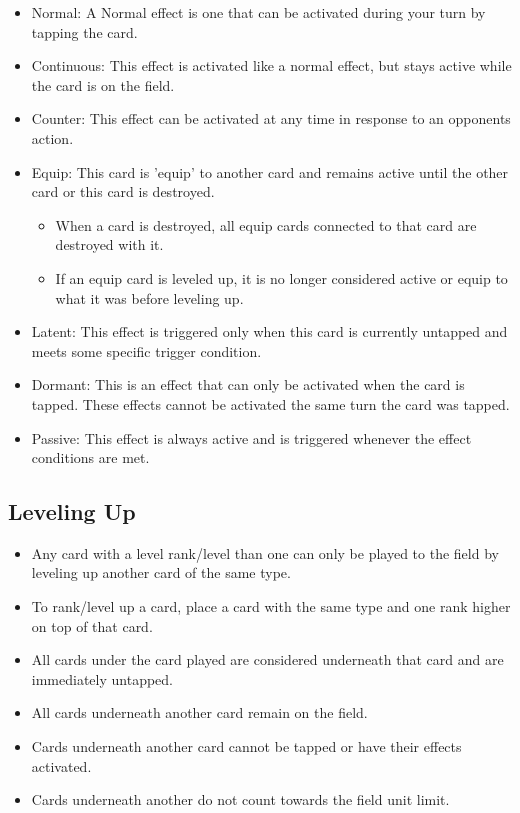 \begin{itemize}
\begin{itemize}
        \item Normal: A Normal effect is one that can be activated during your turn by tapping the card.
        \item Continuous: This effect is activated like a normal effect, but stays active while the card is on the field.
		\item Counter: This effect can be activated at any time in response to an opponents action.
		\item Equip: This card is 'equip' to another card and remains active until the other card or this card is destroyed. 
		\begin{itemize}
			\item When a card is destroyed, all equip cards connected to that card are destroyed with it.
			\item If an equip card is leveled up, it is no longer considered active or equip to what it was before leveling up.
		\end{itemize}
		\item Latent: This effect is triggered only when this card is currently untapped and meets some specific trigger condition. 
		\item Dormant: This is an effect that can only be activated when the card is tapped. These effects cannot be activated the same turn the card was tapped.
  		\item Passive: This effect is always active and is triggered whenever the effect conditions are met.
    \end{itemize}
\end{itemize}








\subsection{Leveling Up}
\begin{itemize}
    \item Any card with a level rank/level than one can only be played to the field by leveling up another card of the same type.
    \item To rank/level up a card, place a card with the same type and one rank higher on top of that card.
    \item All cards under the card played are considered underneath that card and are immediately untapped.
    \item All cards underneath another card remain on the field.
    \item Cards underneath another card cannot be tapped or have their effects activated.
    \item Cards underneath another do not count towards the field unit limit.
\end{itemize}








